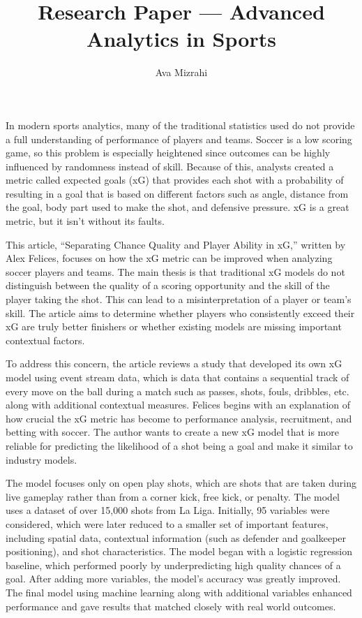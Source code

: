 \documentclass[
  11pt,
  letterpaper,
  DIV=11,
  numbers=noendperiod]{scrartcl}
\title{Research Paper --- Advanced Analytics in Sports}
\author{Ava Mizrahi}
\date{}
\begin{document}
\maketitle


In modern sports analytics, many of the traditional statistics used do
not provide a full understanding of performance of players and teams.
Soccer is a low scoring game, so this problem is especially heightened
since outcomes can be highly influenced by randomness instead of skill.
Because of this, analysts created a metric called expected goals (xG)
that provides each shot with a probability of resulting in a goal that
is based on different factors such as angle, distance from the goal,
body part used to make the shot, and defensive pressure. xG is a great
metric, but it isn't without its faults.

This article, ``Separating Chance Quality and Player Ability in xG,''
written by Alex Felices, focuses on how the xG metric can be improved
when analyzing soccer players and teams. The main thesis is that
traditional xG models do not distinguish between the quality of a
scoring opportunity and the skill of the player taking the shot. This
can lead to a misinterpretation of a player or team's skill. The article
aims to determine whether players who consistently exceed their xG are
truly better finishers or whether existing models are missing important
contextual factors.

To address this concern, the article reviews a study that developed its
own xG model using event stream data, which is data that contains a
sequential track of every move on the ball during a match such as
passes, shots, fouls, dribbles, etc. along with additional contextual
measures. Felices begins with an explanation of how crucial the xG
metric has become to performance analysis, recruitment, and betting with
soccer. The author wants to create a new xG model that is more reliable
for predicting the likelihood of a shot being a goal and make it similar
to industry models.

The model focuses only on open play shots, which are shots that are
taken during live gameplay rather than from a corner kick, free kick, or
penalty. The model uses a dataset of over 15,000 shots from La Liga.
Initially, 95 variables were considered, which were later reduced to a
smaller set of important features, including spatial data, contextual
information (such as defender and goalkeeper positioning), and shot
characteristics. The model began with a logistic regression baseline,
which performed poorly by underpredicting high quality chances of a
goal. After adding more variables, the model's accuracy was greatly
improved. The final model using machine learning along with additional
variables enhanced performance and gave results that matched closely
with real world outcomes.
\end{document}
